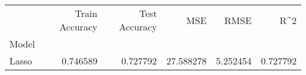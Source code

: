 \begin{tabular}{lrrrrr}
\toprule
{} &  Train Accuracy &  Test Accuracy &        MSE &      RMSE &       R\textasciicircum 2 \\
Model &                 &                &            &           &           \\
\midrule
Lasso &        0.746589 &       0.727792 &  27.588278 &  5.252454 &  0.727792 \\
\bottomrule
\end{tabular}
